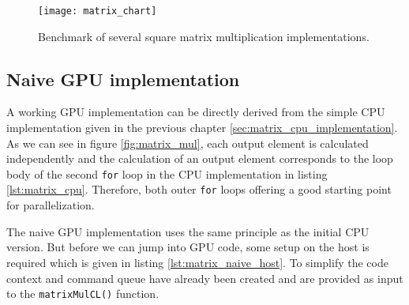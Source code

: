 \begin{figure}
	\centering
	\texttt{[image: matrix\_chart]}
	\caption{Benchmark of several square matrix multiplication implementations. %
	}
	\label{fig:matrix_chart}
\end{figure}

\subsection{Naive GPU implementation}
\label{sec:matrix_mul_naive}

A working GPU implementation can be directly derived from the simple CPU implementation given in the previous chapter \ref{sec:matrix_cpu_implementation}. As we can see in figure \ref{fig:matrix_mul}, each output element is calculated independently and the calculation of an output element corresponds to the loop body of the second \lstinline!for! loop in the CPU implementation in listing \ref{lst:matrix_cpu}. Therefore, both outer \lstinline!for! loops offering a good starting point for parallelization. 

The naive GPU implementation uses the same principle as the initial CPU version. But before we can jump into GPU code, some setup on the host is required which is given in listing \ref{lst:matrix_naive_host}. To simplify the code context and command queue have already been created and are provided as input to the \lstinline!matrixMulCL()! function.



